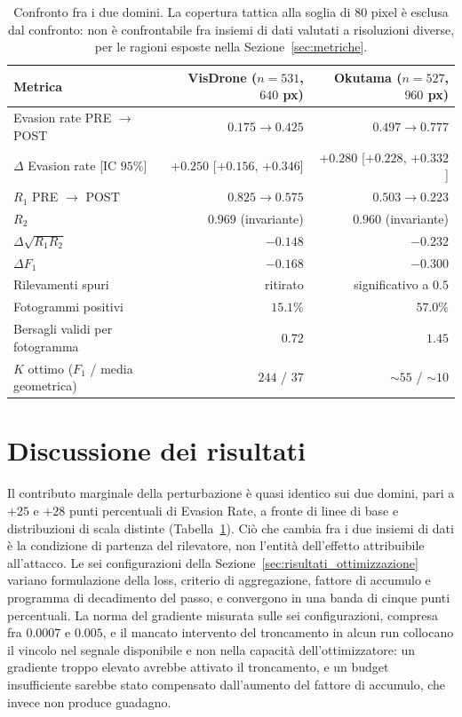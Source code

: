 \documentclass[a4paper,12pt]{report}
\begin{document}
\begin{table}[t]
\centering
\small
\begin{tabular}{lrr}
\toprule
Metrica & VisDrone ($n = 531$, $640$ px) & Okutama ($n = 527$, $960$ px) \\
\midrule
Evasion rate PRE $\to$ POST & $0.175 \to 0.425$ & $0.497 \to 0.777$ \\
$\Delta$ Evasion rate [IC $95\%$] & $+0.250$ [$+0.156$, $+0.346$] & $+0.280$ [$+0.228$, $+0.332$] \\
$R_1$ PRE $\to$ POST & $0.825 \to 0.575$ & $0.503 \to 0.223$ \\
$R_2$ & $0.969$ (invariante) & $0.960$ (invariante) \\
$\Delta \sqrt{R_1 R_2}$ & $-0.148$ & $-0.232$ \\
$\Delta F_1$ & $-0.168$ & $-0.300$ \\
Rilevamenti spuri & ritirato & significativo a $0.5$ \\
Fotogrammi positivi & $15.1\%$ & $57.0\%$ \\
Bersagli validi per fotogramma & $0.72$ & $1.45$ \\
$K$ ottimo ($F_1$ / media geometrica) & $244$ / $37$ & $\sim 55$ / $\sim 10$ \\
\bottomrule
\end{tabular}
\caption{Confronto fra i due domini. La copertura tattica alla soglia di $80$ pixel è esclusa dal confronto: non è confrontabile fra insiemi di dati valutati a risoluzioni diverse, per le ragioni esposte nella Sezione~\ref{sec:metriche}.}
\label{tab:confronto_complessivo}
\end{table}

\section{Discussione dei risultati}
\label{sec:discussione}

Il contributo marginale della perturbazione è quasi identico sui due domini, pari a $+25$ e $+28$ punti percentuali di Evasion Rate, a fronte di linee di base e distribuzioni di scala distinte (Tabella~\ref{tab:confronto_complessivo}). Ciò che cambia fra i due insiemi di dati è la condizione di partenza del rilevatore, non l'entità dell'effetto attribuibile all'attacco. Le sei configurazioni della Sezione~\ref{sec:risultati_ottimizzazione} variano formulazione della loss, criterio di aggregazione, fattore di accumulo e programma di decadimento del passo, e convergono in una banda di cinque punti percentuali. La norma del gradiente misurata sulle sei configurazioni, compresa fra $0.0007$ e $0.005$, e il mancato intervento del troncamento in alcun run collocano il vincolo nel segnale disponibile e non nella capacità dell'ottimizzatore: un gradiente troppo elevato avrebbe attivato il troncamento, e un budget insufficiente sarebbe stato compensato dall'aumento del fattore di accumulo, che invece non produce guadagno.
\end{document}
